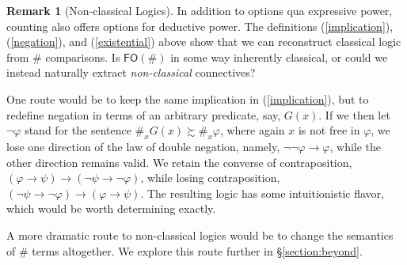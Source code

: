 \documentclass[12pt,oneside,reqno]{amsart}
\theoremstyle{definition}
\newtheorem{remark}{Remark}
\begin{document}
\begin{remark}[Non-classical Logics] In addition to options qua expressive power, counting also offers options for deductive power. The definitions (\ref{implication}), (\ref{negation}), and (\ref{existential}) above show that we can reconstruct classical logic from $\#$ comparisons. Is $\mathsf{FO}(\#)$ in some way inherently classical, or could we instead naturally extract \emph{non-classical} connectives?

One route would be to keep the same implication in (\ref{implication}), but to redefine negation in terms of an arbitrary predicate, say, $G(x)$. If we then let $\neg \varphi$ stand for the sentence $\#_xG(x) \succsim \#_x\varphi$, where again $x$ is not free in $\varphi$, we lose one direction of the law of double negation, namely, $\neg \neg \varphi \rightarrow \varphi$, while the other direction remains valid. We retain the converse of contraposition, $(\varphi \rightarrow \psi) \rightarrow (\neg \psi \rightarrow \neg \varphi)$, while losing contraposition, $(\neg \psi \rightarrow \neg \varphi) \rightarrow (\varphi \rightarrow \psi)$. The resulting logic has some intuitionistic flavor, which would be worth determining exactly. 


A more dramatic route to non-classical logics would be to change the semantics of $\#$ terms altogether.  We explore this route further in \S\ref{section:beyond}.
\end{remark}

\end{document}
